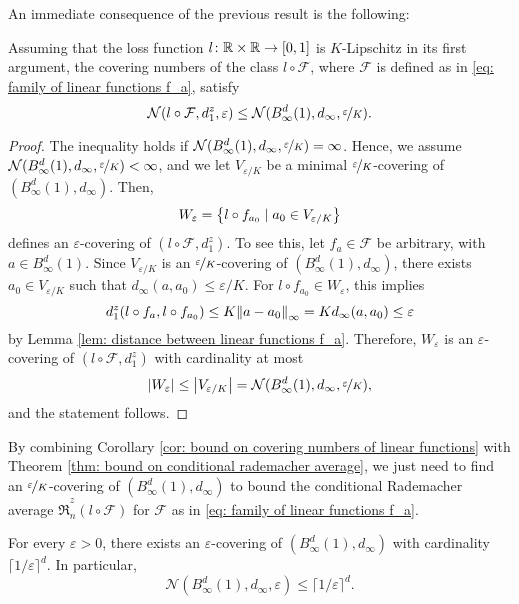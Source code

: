 An immediate consequence of the previous result is the following:

\begin{corollary}
\label{cor: bound on covering numbers of linear functions}
Assuming that the loss function $l \colon \mathbb{R} \times \mathbb{R} \to [0, 1]$ is $K$-Lipschitz in its first argument, the covering numbers of the class $l \circ \mathcal{F}$, where $\mathcal{F}$ is defined as in \eqref{eq: family of linear functions f_a}, satisfy
\[
    \mathcal{N}(l \circ \mathcal{F}, d_1^z, \varepsilon) \leq \mathcal{N}(B_{\infty}^d(1), d_{\infty}, \nicefrac{\varepsilon}{K}).
\]
\end{corollary}

\begin{proof}
The inequality holds if $\mathcal{N}(B_{\infty}^d(1), d_{\infty}, \nicefrac{\varepsilon}{K}) = \infty$. Hence, we assume $\mathcal{N}(B_{\infty}^d(1), d_{\infty}, \nicefrac{\varepsilon}{K}) < \infty$, and we let $V_{\varepsilon / K}$ be a minimal $\nicefrac{\varepsilon}{K}$-covering of $(B_{\infty}^d(1), d_{\infty})$. Then,
\[
    W_{\varepsilon} = \set{l \circ f_{a_0} \with a_0 \in V_{\varepsilon / K}}
\]
defines an $\varepsilon$-covering of $(l \circ \mathcal{F}, d_1^z)$. To see this, let $f_a \in \mathcal{F}$ be arbitrary, with $a \in B_{\infty}^d(1)$. Since $V_{\varepsilon / K}$ is an $\nicefrac{\varepsilon}{K}$-covering of $(B_{\infty}^d(1), d_{\infty})$, there exists $a_0 \in V_{\varepsilon / K}$ such that $d_{\infty}(a, a_0) \leq \varepsilon / K$. For $l \circ f_{a_0} \in W_{\varepsilon}$, this implies
\[
    d_1^z(l \circ f_a, l \circ f_{a_0}) \leq K \norm{a - a_0}_{\infty} = K d_{\infty}(a, a_0) \leq \varepsilon
\]
by Lemma \ref{lem: distance between linear functions f_a}. Therefore, $W_{\varepsilon}$ is an $\varepsilon$-covering of $(l \circ \mathcal{F}, d_1^z)$ with cardinality at most
\[
    \abs{W_{\varepsilon}} \leq \abs{V_{\varepsilon / K}} = \mathcal{N}(B_{\infty}^d(1), d_{\infty}, \nicefrac{\varepsilon}{K}),
\]
and the statement follows.
\end{proof}

By combining Corollary \ref{cor: bound on covering numbers of linear functions} with Theorem \ref{thm: bound on conditional rademacher average}, we just need to find an $\nicefrac{\varepsilon}{K}$-covering of $(B_{\infty}^d(1), d_{\infty})$ to bound the conditional Rademacher average $\hat{\mathfrak{R}}_n^z(l \circ \mathcal{F})$ for $\mathcal{F}$ as in \eqref{eq: family of linear functions f_a}.

\begin{lemma}
For every $\varepsilon > 0$, there exists an $\varepsilon$-covering of $(B_{\infty}^d(1), d_{\infty})$ with cardinality $\lceil 1 / \varepsilon \rceil^d$. In particular,
\[
    \mathcal{N}(B_{\infty}^d(1), d_{\infty}, \varepsilon) \leq {\lceil 1 / \varepsilon \rceil}^d.
\]
\end{lemma}


